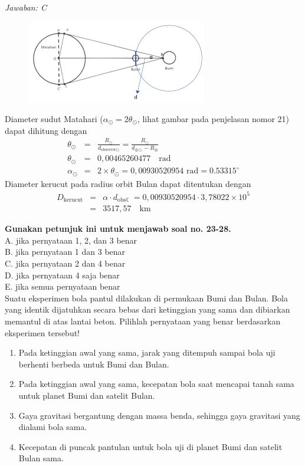 \documentclass[11pt,fleqn, a4paper]{exam}
\begin{document}
\begin{questions}
\textit{Jawaban: C}\\
\begin{figure}[H]
\centering
\includegraphics[width=0.7\textwidth]{gambar/osk2016_22b.png}
\end{figure}
Diameter sudut Matahari ($\alpha_{\odot} = 2 \theta_{\odot}$, lihat gambar pada penjelasan nomor 21) dapat dihitung dengan 
\begin{eqnarray*}
\theta_{\odot} &=& \frac{R_{\odot}}{d_{\text{observer} \odot}} = \frac{R_{\odot}}{d_{\oplus \odot} - R_{\oplus}}\\
\theta_{\odot} &=& 0,00465260477 \quad \text{rad} \\
\alpha_{\odot} &=& 2 \times \theta_{\odot} = 0,00930520954 \text{ rad} = 0.53315^{\circ}
\end{eqnarray*}
Diameter kerucut pada radius orbit Bulan dapat ditentukan dengan
\begin{eqnarray*}
D_{\text{kerucut}} &=& \alpha \cdot d_{\text{obs} \leftmoon} = 0,00930520954 \cdot 3,78022\times 10^5\\
&=& 3517,57 \quad \text{km}
\end{eqnarray*}

\vspace{1cm}
\textbf{Gunakan petunjuk ini untuk menjawab soal no. 23-28.}\\
A. jika pernyataan  1, 2, dan 3 benar\\
B. jika pernyataan 1 dan 3 benar\\
C. jika pernyataan 2 dan 4 benar\\
D. jika pernyataan 4 saja benar\\
E. jika semua pernyataan benar\\

\question Suatu eksperimen bola pantul dilakukan di permukaan Bumi dan Bulan. Bola yang identik dijatuhkan secara bebas dari ketinggian yang sama dan dibiarkan memantul di atas lantai beton. Pilihlah pernyataan yang benar berdasarkan eksperimen tersebut!
\begin{enumerate}
\item Pada ketinggian awal yang sama, jarak yang ditempuh sampai bola uji berhenti berbeda untuk Bumi dan Bulan.
\item Pada ketinggian awal yang sama, kecepatan bola saat mencapai tanah sama untuk planet Bumi dan satelit Bulan.
\item Gaya gravitasi bergantung dengan massa benda, sehingga gaya gravitasi yang dialami bola sama.
\item Kecepatan di puncak pantulan untuk bola uji di planet Bumi dan satelit Bulan sama.
\end{enumerate}


\end{questions}
\end{document}
